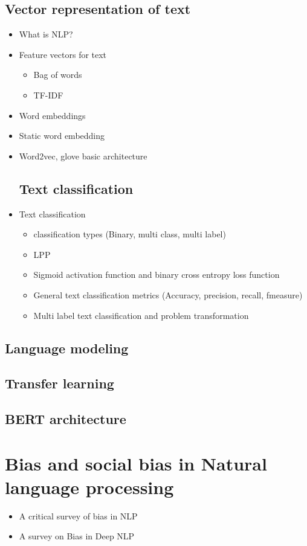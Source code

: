     \subsection{Vector representation of text}
    \begin{itemize}
        \item What is NLP?
        \item Feature vectors for text 
            \begin{itemize}
                \item Bag of words
                \item TF-IDF
            \end{itemize}
        \item Word embeddings
        \item Static word embedding
        \item Word2vec, glove basic architecture
    \subsection{Text classification}    \item Text classification 
        \begin{itemize}
            \item classification types (Binary, multi class, multi label)
            \item LPP
            \item Sigmoid activation function and binary cross entropy loss function
            \item General text classification metrics (Accuracy, precision, recall, fmeasure)
            \item Multi label text classification and problem transformation 
        \end{itemize}
    \end{itemize}
    \subsection{Language modeling}
    \subsection{Transfer learning}
    \subsection{BERT architecture}
\section{Bias and social bias in Natural language processing}
\begin{itemize}
    \item A critical survey of bias in NLP \cite{blodgett2020language}
    \item A survey on Bias in Deep NLP \cite{garrido2021survey}
\end{itemize}